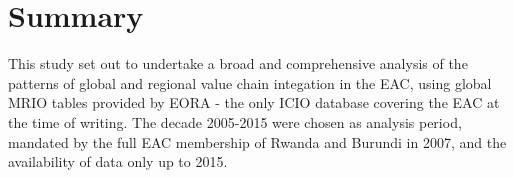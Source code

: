 \documentclass[a4paper]{article}
\begin{document}
%
%
%


\section{Summary}

This study set out to undertake a broad and comprehensive analysis of the patterns of global and regional value chain integation in the EAC, using global MRIO tables provided by EORA - the only ICIO database covering the EAC at the time of writing. The decade 2005-2015 were chosen as analysis period, mandated by the full EAC membership of Rwanda and Burundi in 2007, and the availability of data only up to 2015. \newline
\end{document}
